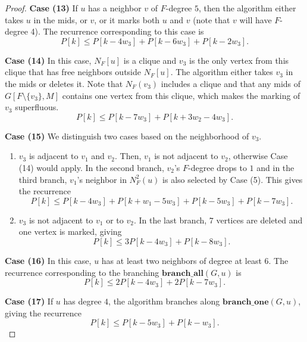 \documentclass[a4paper,10pt]{article}
\theoremstyle{plain}
\theoremstyle{definition}
\theoremstyle{remark}
\newcommand{\mids}{mids\xspace}
\newcommand{\brancha}{\mathbf{branch\_all}}
\newcommand{\brancho}{\mathbf{branch\_one}}
\begin{document}
\begin{proof}
{\bf Case (13)}
If $u$ has a neighbor $v$ of $F$-degree $5$, then the algorithm either takes $u$ in the 
\mids, or $v$, or it marks both $u$ and $v$ (note that $v$ will have $F$-degree 4). The recurrence corresponding to this case is
\begin{equation}
P[k] \leq P[k-4w_3]+P[k-6w_3]+P[k-2w_3].\label{rec:tight4}
\end{equation}

{\bf Case (14)}
In this case, $N_F[u]$ is a clique and $v_3$ is the only vertex from this clique that has
free neighbors outside $N_F[u]$. The algorithm either takes $v_3$ in the \mids or deletes 
it. Note that $N_F(v_3)$ includes a clique and that any \mids of $G[F\setminus 
\{v_3\},M]$ contains one vertex from this clique, which makes the marking of $v_3$ superfluous. 
\begin{equation}
P[k] \leq P[k-7w_3]+P[k+3w_2-4w_3].
\end{equation}

{\bf Case (15)}
We distinguish two cases based on the neighborhood of $v_3$.
\begin{enumerate}
\item $v_3$ is adjacent to $v_1$ and $v_2$. Then, $v_1$ is not adjacent to $v_2$, otherwise
Case (14) would apply. In the second branch, $v_2$'s $F$-degree drops to $1$ and in the
third branch, $v_1$'s neighbor in $N_F^2(u)$ is also selected by Case (5). This gives the
recurrence
\begin{equation}
P[k] \leq P[k-4w_3]+P[k+w_1-5w_3]+P[k-5w_3]+P[k-7w_3].
\end{equation}
\item $v_3$ is not adjacent to $v_1$ or to $v_2$. In the last branch, $7$ vertices are deleted and one vertex is marked, giving
\begin{equation}
P[k] \leq 3P[k-4w_3]+P[k-8w_3].
\end{equation}
\end{enumerate}

{\bf Case (16)}
In this case, $u$ has at least two neighbors of degree at least $6$. The recurrence corresponding to the branching $\brancha(G,u)$ is
\begin{equation}
P[k] \leq 2P[k-4w_3]+2P[k-7w_3].
\end{equation}

{\bf Case (17)}
If $u$ has degree $4$, the algorithm branches along $\brancho(G,u)$, giving the recurrence
\begin{equation}
P[k] \leq P[k-5w_3]+P[k-w_3].
\end{equation}


\end{proof}
\end{document}
